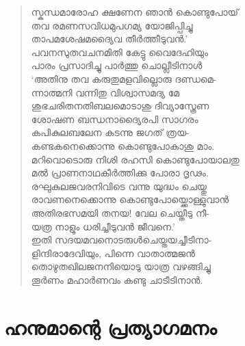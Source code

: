 \begin{verse}
സ്കന്ധമാരോഹ ക്ഷണേന ഞാന്‍ കൊണ്ടുപോയ്\\
തവ രമണസവിധമുപഗമ്യ യോജിപ്പിച്ചു\\
താപമശേഷമദ്യൈവ തീര്‍ത്തീടുവന്‍.’\\
പവനസുതവചനമിതി കേട്ടു വൈദേഹിയും\\
പാരം പ്രസാദിച്ചു പാര്‍ത്തു ചൊല്ലീടിനാള്‍\\
‘അതിനു തവ കരുതുമളവില്ലൊരു ദണ്ഡമെ-\\
ന്നാത്മനി വന്നിതു വിശ്വാസമദ്യ മേ\\
ശുഭചരിതനതിബലമൊടാശു ദിവ്യാസ്ത്രേണ\\
ശോഷണ ബന്ധനാദ്യൈരപി സാഗരം\\
കപികുലബലേന കടന്നു ജഗത് ത്രയ-\\
കണ്ടകനെക്കൊന്നു കൊണ്ടുപോകാശു മാം.\\
മറിവൊടൊരു നിശി രഹസി കൊണ്ടുപോയാലതു\\
മല്‍ പ്രാണനാഥകീര്‍ത്തിക്കു പോരാ ദൃഢം.\\
രഘുകുലജവരനിവിടെ വന്നു യുദ്ധം ചെയ്തു\\
രാവണനെക്കൊന്നു കൊണ്ടുപോയ്ക്കൊള്ളുവാന്‍\\
അതിരഭസമയി തനയ! വേല ചെയ്തീടു നീ-\\
യത്ര നാളും ധരിച്ചീടുവന്‍ ജീവനെ.’\\
ഇതി സദയമവനൊടരുള്‍ചെയ്തയച്ചീടിനാ-\\
ളിന്ദിരാദേവിയും, പിന്നെ വാതാത്മജന്‍\\
തൊഴുതഖിലജനനിയൊടു യാത്ര വഴങ്ങിച്ചു\\
തൂര്‍ണം മഹാര്‍ണവം കണ്ടു ചാടീടിനാന്‍.
\end{verse}


\section{ഹനുമാന്റെ പ്രത്യാഗമനം}

